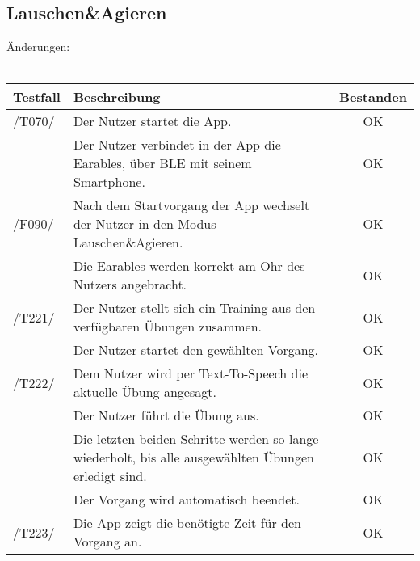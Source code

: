 \documentclass[a4paper,12pt]{article}
\begin{document}
\subsection{Lauschen\&Agieren}
Änderungen:
\\
\\
\begin{tabular}{ |p{1.5cm} | p{12cm} | c| }
	\hline
	\textbf{Testfall} & \textbf{Beschreibung} & \textbf{Bestanden}\\
	\hline
	/T070/ & Der Nutzer startet die App. & OK\\
	\hline
	& Der Nutzer verbindet in der App die Earables, über BLE mit seinem Smartphone. & OK \\
	\hline
	/F090/ & Nach dem Startvorgang der App wechselt der Nutzer in den Modus \glqq Lauschen\&Agieren\grqq . & OK \\
	\hline
	& Die Earables werden korrekt am Ohr des Nutzers angebracht. & OK \\
	\hline
	/T221/ & Der Nutzer stellt sich ein Training aus den verfügbaren Übungen zusammen. & OK \\
	\hline
	& Der Nutzer startet den gewählten Vorgang. & OK \\
	\hline
	/T222/ & Dem Nutzer wird per Text-To-Speech die aktuelle Übung angesagt. & OK \\
	\hline
	& Der Nutzer führt die Übung aus. & OK \\
	\hline
	& Die letzten beiden Schritte werden so lange wiederholt, bis alle ausgewählten Übungen erledigt sind. & OK \\
	\hline
	& Der Vorgang wird automatisch beendet. & OK \\
	\hline
	/T223/ & Die App zeigt die benötigte Zeit für den Vorgang an. & OK \\
	\hline
\end{tabular}
\end{document}
